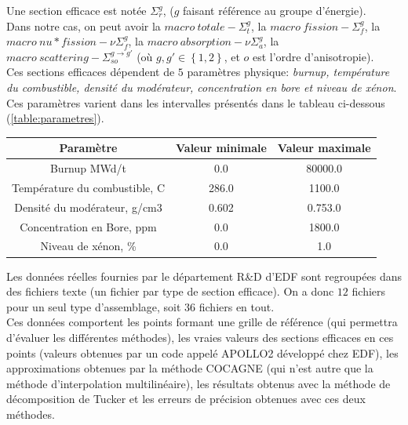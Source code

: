 Une section efficace est notée $\Sigma_r^g$, ($g$ faisant référence au groupe d'énergie).\\
\hspace{0.5cm}
Dans notre cas, on peut avoir la $macro\ totale-\Sigma_t^g$, la $macro\ fission-\Sigma_f^g$, la $macro\ nu*fission-\nu\Sigma_f^g$, la $macro\ absorption-\nu\Sigma_a^g$,
la $macro\ scattering-\Sigma_{so}^{g\rightarrow g'}$ (où $g,g' \in \left \{1,2\right\}$, et $o$ est l'ordre d'anisotropie).\\
Ces sections efficaces dépendent de $5$ paramètres physique: \textit{burnup, température du combustible, densité du modérateur, concentration en bore et niveau de xénon}. Ces paramètres varient dans les intervalles présentés dans le tableau ci-dessous (\ref{table:parametres}).\\
\begin{center}
\begin{tabular}{|*{3}{c|}}
	\hline
	Paramètre 											& Valeur minimale & Valeur maximale \\
	\hline
	Burnup MWd/t 										& 0.0 						& 80000.0 \\
	\hline
	Température du combustible, C		& 286.0 					& 1100.0	\\
	\hline
	Densité du modérateur, g/cm3 		& 0.602 					& 0.753.0 \\
	\hline
	Concentration en Bore, ppm 			& 0.0 						& 1800.0 	\\
	\hline
	Niveau de xénon, \% 						& 0.0 						& 1.0 		\\
	\hline
\end{tabular}
\label{table:parametres}
\end{center}
\vspace{0.5cm}
\hspace{0.5cm}
Les données réelles fournies par le département R\&D d'EDF sont regroupées dans des fichiers texte (un fichier par type de section efficace). On a donc $12$ fichiers pour un seul type d'assemblage, soit $36$ fichiers en tout.\\
Ces données comportent les points formant une grille de référence (qui permettra d'évaluer les différentes méthodes), les vraies valeurs des sections efficaces en ces points (valeurs obtenues par un code appelé APOLLO2 développé chez EDF), les approximations obtenues par la méthode COCAGNE (qui n'est autre que la méthode d'interpolation multilinéaire), les résultats obtenus avec la méthode de décomposition de Tucker et les erreurs de précision obtenues avec ces deux méthodes.\\
